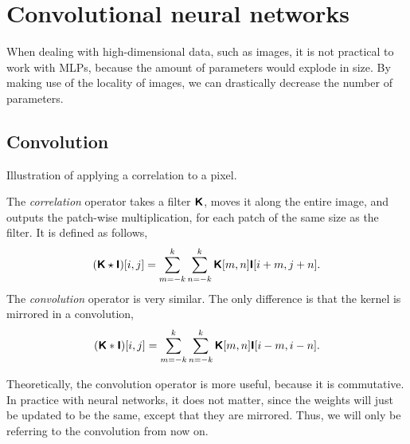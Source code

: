 \section{Convolutional neural networks}

When dealing with high-dimensional data, such as images, it is not practical to work with MLPs,
because the amount of parameters would explode in size. By
making use of the locality of images, we can drastically decrease the number of parameters.

\subsection{Convolution}

\begin{marginfigure}
    \centering
    \caption{Illustration of applying a correlation to a pixel.}
    \label{fig:correlation}
\end{marginfigure}

The \textit{correlation} operator takes a filter $\bm{\mathsf{K}}$, moves it along the entire image, and
outputs the patch-wise multiplication, for each patch of the same size as the filter. It is defined
as follows, \[
    (\bm{\mathsf{K}} \star \bm{\mathsf{I}})[i,j] = \sum_{m=-k}^{k} \sum_{n=-k}^{k} \bm{\mathsf{K}}[m, n] \bm{\mathsf{I}}[i+m, j+n].
\]
The \textit{convolution} operator is very similar. The only difference is that the kernel is
mirrored in a convolution, \[
    (\bm{\mathsf{K}} * \bm{\mathsf{I}})[i,j] = \sum_{m=-k}^k \sum_{n=-k}^{k} \bm{\mathsf{K}}[m,n] \bm{\mathsf{I}}[i-m, i-n].
\]

Theoretically, the convolution operator is more useful, because it is
commutative. In practice with neural networks, it does not matter, since the
weights will just be updated to be the same, except that they are mirrored. Thus, we will only be
referring to the convolution from now on.


